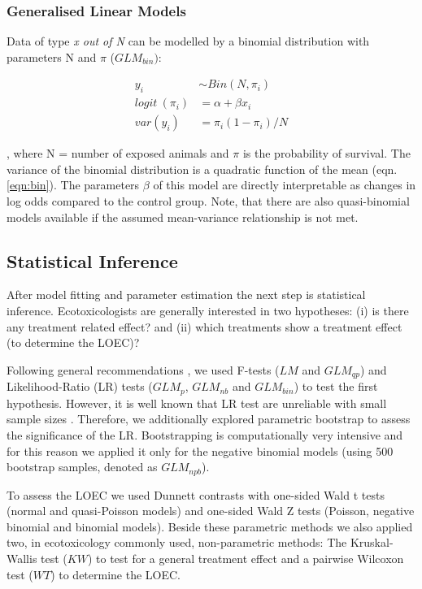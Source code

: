\documentclass[twocolumn, natbib]{svjour3}
\providecommand{\DIFadd}[1]{{\protect\color{blue}\uwave{#1}}} %
\providecommand{\DIFaddbegin}{} %
\providecommand{\DIFaddend}{} %
\begin{document}
\subsubsection{Generalised Linear Models}
Data of type \emph{x out of N} can be modelled by a binomial distribution with parameters N and $\pi$ ($GLM_{bin})$:

\begin{align}
  y_i &\sim Bin(N, \pi_i) \nonumber \\
  logit~(\pi_i) &= \alpha + \beta x_i \label{eqn:bin} \\
  var(y_i) &=  \pi_i (1 - \pi_i) / N \nonumber
\end{align}

, where N = number of exposed animals and $\pi$ is the probability of survival.
The variance of the binomial distribution is a quadratic function of the mean (eqn. \ref{eqn:bin}).
The parameters $\beta$ of this model are directly interpretable as changes in log odds compared to the control group.
Note, that there are also quasi-binomial models available if the assumed mean-variance relationship is not met. 


\subsection{Statistical Inference}
After model fitting and parameter estimation the next step is statistical inference.
Ecotoxicologists are generally interested in two hypotheses: (i) is there any treatment related effect? and (ii) which treatments show a treatment effect (to determine the LOEC)?

Following general recommendations \citep{bolker_generalized_2009,faraway_extending_2006}, we used F-tests ($LM$ and $GLM_{qp}$) and Likeli\-hood-Ratio (LR) tests ($GLM_p$, $GLM_{nb}$ and $GLM_{bin}$) to test the first hypothesis.
However, it is well known that LR test are unreliable with small sample sizes \citep{wilks_large-sample_1938}.
Therefore, we additionally explored \DIFaddbegin \DIFadd{the }\DIFaddend parametric bootstrap \citep{faraway_extending_2006} to assess the significance of the LR.
Bootstrapping is computationally very intensive and for this reason we applied it only for the negative binomial models (using 500 bootstrap samples, denoted as $GLM_{npb}$).

To assess the LOEC we used Dunnett contrasts \DIFaddbegin \citep{dunnett_multiple_1955} \DIFaddend with one-sided Wald t tests (normal and quasi-Poisson models) and one-sided Wald Z tests (Poisson, negative binomial and binomial models).
Beside these parametric methods we also applied two, in ecotoxicology commonly used, non-parametric methods: The Kruskal-Wallis test  ($KW$) to test for a general treatment effect and a pairwise Wilcoxon test ($WT$) to determine the LOEC.
\end{document}
